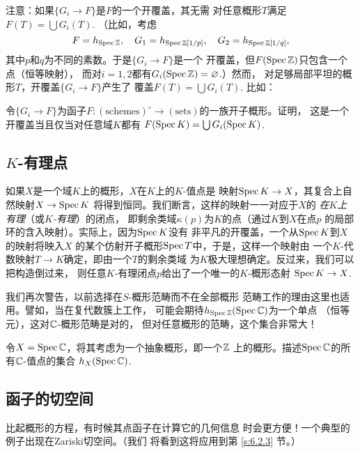 注意：如果$\{G_i\to F\}$是$F$的一个开覆盖，其无需
对任意概形$T$满足$F(T)=\bigcup G_i(T)$. （比如，考虑
\[
	F=h_{\operatorname{Spec} \mathbb{Z}},\quad G_1=h_{\operatorname{Spec} \mathbb{Z}[1/p]},
	\quad G_2=h_{\operatorname{Spec} \mathbb{Z}[1/q]},
\]
其中$p$和$q$为不同的素数。于是$\{G_i\to F\}$是一个
开覆盖，但$F(\operatorname{Spec} \mathbb{Z})$只包含一个点（恒等映射），
而对$i=1,2$都有$G_i(\operatorname{Spec} \mathbb{Z})=\varnothing$.）然而，
对足够局部平坦的概形$T$，开覆盖$\{G_i\to F\}$产生了
覆盖$F(T)=\bigcup G_i(T)$. 比如：


\begin{exe} \label{exe:6.11}
	令$\{G_i\to F\}$为函子$F:(\text{schemes})^\circ
	\to (\text{sets})$的一族开子概形。证明，
	这是一个开覆盖当且仅当对任意域$K$都有
	$F(\operatorname{Spec} K)=\bigcup G_i(\operatorname{Spec} K)$.
\end{exe}

\subsection{\texorpdfstring{$K$}{K}-有理点}
\label{s:6.1.2}

如果$X$是一个域$K$上的概形，$X$在$K$上的$K$-值点是
映射$\operatorname{Spec} K\to X$，其复合上自然映射$X\to \operatorname{Spec} K$
将得到恒同。我们断言，这样的映射一一对应于$X$的
\textit{在$K$上有理}（或\textit{$K$-有理}）的闭点，
即剩余类域$\kappa(p)$为$K$的点（通过$K$到$X$在点$p$
的局部环的含入映射）。实际上，因为$\operatorname{Spec} K$没有
非平凡的开覆盖，一个从$\operatorname{Spec} K$到$X$的映射将映入$X$
的某个仿射开子概形$\operatorname{Spec} T$中，于是，这样一个映射由
一个$K$-代数映射$T\to K$确定，即由一个$T$的剩余类域
为$K$极大理想确定。反过来，我们可以把构造倒过来，
则任意$K$-有理闭点$p$给出了一个唯一的$K$-概形态射
$\operatorname{Spec} K\to X$.

我们再次警告，以前选择在$S$-概形范畴而不在全部概形
范畴工作的理由这里也适用。譬如，当在复代数簇上工作，
可能会期待$h_{\operatorname{Spec} \mathbb{Z}}(\operatorname{Spec} \mathbb{C})$为一个单点
（恒等元），这对$\mathbb{C}$-概形范畴是对的，
但对任意概形的范畴，这个集合非常大！

\begin{exe}\label{exe:6.12}
令$X=\operatorname{Spec} \mathbb{C}$，将其考虑为一个抽象概形，即一个$\mathbb{Z}$
上的概形。描述$\operatorname{Spec} \mathbb{C}$的所有$\mathbb{C}$-值点的集合
$h_X(\operatorname{Spec} \mathbb{C})$.
\end{exe}

\subsection{函子的切空间} \label{s:6.1.3}

比起概形的方程，有时候其点函子在计算它的几何信息
时会更方便！一个典型的例子出现在Zariski切空间。（我们
将看到这将应用到第 \ref{s:6.2.3} 节。）


